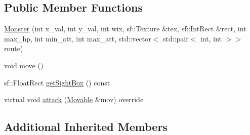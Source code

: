\subsection*{Public Member Functions}
\begin{DoxyCompactItemize}
\item 
\hyperlink{classMonster_a975fd20f80f83dbc5dfc7bbcf5cb4cda}{Monster} (int x\+\_\+val, int y\+\_\+val, int wix, sf\+::\+Texture \&tex, sf\+::\+Int\+Rect \&rect, int max\+\_\+hp, int min\+\_\+att, int max\+\_\+att, std\+::vector$<$ std\+::pair$<$ int, int $>$$>$ route)
\item 
void \hyperlink{classMonster_a29d08fe330b6cad13e614693f1f3e16f}{move} ()
\item 
sf\+::\+Float\+Rect \hyperlink{classMonster_a1a595dfe12931dcd0ec4dbf41c8d22cc}{get\+Sight\+Box} () const 
\item 
virtual void \hyperlink{classMonster_a4185a3f93c9a4bdd9fa8caf95ffedab8}{attack} (\hyperlink{classMovable}{Movable} \&mov) override
\end{DoxyCompactItemize}
\subsection*{Additional Inherited Members}


